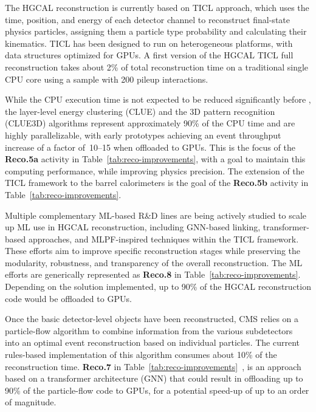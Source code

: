 The \gls{HGCAL} reconstruction is currently based on \gls{TICL} approach, which uses the time, position, and energy of each detector channel to reconstruct final-state physics particles, assigning them a particle type probability and calculating their kinematics.
\gls{TICL} has been designed to run on heterogeneous platforms, with data structures optimized for \glspl{GPU}.
A first version of the \gls{HGCAL} \gls{TICL} full reconstruction takes about 2\% of total \PhaseTwo reconstruction time on a traditional single \gls{CPU} core using a sample with 200 pileup interactions. 

While the \gls{CPU} execution time is not expected to be reduced significantly before \RunFour, the layer-level energy clustering (CLUE) and the 3D pattern recognition (CLUE3D) algorithms represent approximately 90\% of the \gls{CPU} time and are highly parallelizable, with early prototypes achieving an event throughput increase of a factor of~10--15 when offloaded to \glspl{GPU}. This is the focus of the  \textbf{Reco.5a} activity in Table~\ref{tab:reco-improvements}, with a goal to maintain this computing performance, while improving physics precision. The extension of the \gls{TICL} framework to the barrel calorimeters is the goal of the \textbf{Reco.5b} activity in Table~\ref{tab:reco-improvements}. 

Multiple complementary ML-based R\&D lines are being actively studied to scale up ML use in \gls{HGCAL} reconstruction, including GNN-based linking, transformer-based approaches, and MLPF-inspired techniques within the \gls{TICL} framework. These efforts aim to improve specific reconstruction stages while preserving the modularity, robustness, and transparency of the overall reconstruction. The ML efforts are generically represented as \textbf{Reco.8} in Table~\ref{tab:reco-improvements}. Depending on the solution implemented, up to 90\% of the \gls{HGCAL} reconstruction code would be offloaded to \glspl{GPU}.

Once the basic detector-level objects have been reconstructed, CMS relies on a particle-flow algorithm to combine information from the various subdetectors~\cite{CMS:2017yfk} into an optimal event reconstruction based on individual particles. The current rules-based implementation of this algorithm consumes about  10\% of the reconstruction time. \textbf{Reco.7} in Table~\ref{tab:reco-improvements}~\cite{Pata:2021oez}, is an approach based on a transformer architecture (\gls{GNN}) that could result in offloading up to 90\% of the particle-flow code to \glspl{GPU}, for a potential speed-up of up to an order of magnitude.

